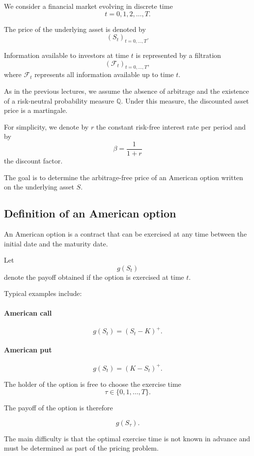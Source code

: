 \documentclass[11pt]{article}
\newcommand{\Qbb}{\mathbb{Q}}
\theoremstyle{definition}
\theoremstyle{plain}
\begin{document}
We consider a financial market evolving in discrete time
\[
t=0,1,2,\dots,T .
\]

The price of the underlying asset is denoted by
\[
(S_t)_{t=0,\dots,T}.
\]

Information available to investors at time \(t\) is represented by a
filtration
\[
(\mathcal{F}_t)_{t=0,\dots,T},
\]
where \(\mathcal{F}_t\) represents all information available up to time \(t\).

As in the previous lectures, we assume the absence of arbitrage and the
existence of a risk-neutral probability measure \(\Qbb\).
Under this measure, the discounted asset price is a martingale.

For simplicity, we denote by \(r\) the constant risk-free interest rate
per period and by
\[
\beta = \frac{1}{1+r}
\]
the discount factor.

\medskip

The goal is to determine the arbitrage-free price of an American option
written on the underlying asset \(S\).

\subsection{Definition of an American option}

An American option is a contract that can be exercised at any time
between the initial date and the maturity date.

Let
\[
g(S_t)
\]
denote the payoff obtained if the option is exercised at time \(t\).

Typical examples include:

\paragraph{American call}
\[
g(S_t) = (S_t-K)^+.
\]

\paragraph{American put}
\[
g(S_t) = (K-S_t)^+.
\]

The holder of the option is free to choose the exercise time
\[
\tau \in \{0,1,\dots,T\}.
\]

The payoff of the option is therefore

\[
g(S_\tau).
\]

The main difficulty is that the optimal exercise time is not known in
advance and must be determined as part of the pricing problem.
\end{document}
